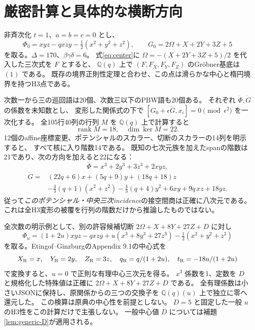 \documentclass[11pt,a4paper]{ltjsarticle}
\theoremstyle{definition}\newtheorem{definition}[theorem]{定義}
\theoremstyle{remark}\newtheorem{remark}[theorem]{注意}
\begin{document}
\section{厳密計算と具体的な横断方向}\label{sec:exact}
非斉次化 $t=1$、$a=b=c=0$ とし、
\[
\Phi_0=xyz-qxzy-\tfrac12(x^2+y^2+z^2),\qquad
G_0=2\Omega+X+2Y+3Z+5
\]
を取る。$\Delta=170$、$\beta\gamma\delta=6$。
式\eqref{eq:center}に $\Omega=-(X+2Y+3Z+5)/2$ を代入した三次式を $F$ とすると、
$\mathbb Q(q)$ 上で $(F,F_X,F_Y,F_Z)$ のGr\"obner基底は $(1)$ である。
既存の境界正則性定理と合わせ、この点は滑らかな中心と楕円境界を持つH3点である。

次数一から三の巡回語は20個、次数三以下のPBW語も20個ある。
それぞれ $\dot\Phi,\dot G$ の係数を未知数とし、
変形した関係式の下で $[G_0+\epsilon\dot G,x_i]=0\pmod{\epsilon^2}$ を一次化する。
全105行40列の行列 $M$ を $\mathbb Q(q)$ 上で計算すると
\[
\operatorname{rank}M=18,\quad\dim\ker M=22.
\]
12個のaffine座標変更、ポテンシャルのスカラー、切断のスカラーの14列を明示すると、
すべて核に入り階数14である。
既知の七次元族を加えたspanの階数は21であり、次の方向を加えると22になる：
\[
\dot\Phi=x^3+2y^3+3z^3+2xyz,
\]
\begin{align*}
\dot G={}&(22q+6)x+(5q+9)y+(18q+18)z\\
&-\tfrac43(q+1)(x^2+z^2)-\tfrac43(q+4)y^2+6xy+9q\,xz+18yz.
\end{align*}
従って\emph{このポテンシャル・中央三次incidence}の接空間商は正確に八次元である。
これは全H3変形の被覆を行列の階数だけから推論したものではない。

全次数の明示例として、別の許容候補切断
$2\Omega+X+8Y+27Z+D$ に対し
\begin{equation}\label{eq:explicit-integral}
\Phi_u=(1+2u)xyz-qxzy+u(x^3+8y^3+27z^3)-\tfrac12(x^2+y^2+z^2)
\end{equation}
を取る。Etingof--GinzburgのAppendix 9.1の中心式を
\[
X_{\rm R}=x,\quad Y_{\rm R}=2y,\quad Z_{\rm R}=3z,
\quad q_{\rm R}=q/(1+2u),\quad t_{\rm R}=-18u/(1+2u)
\]
で変換すると、$u=0$ で正則な有理中心三次元を得る。
$x^3$ 係数を1、定数を $D$ と規格化した特殊値は正確に
$2\Omega+X+8Y+27Z+D$ である。
全有理係数は小さいJSONに保持し、原関係からの三つの交換子を
$\mathbb Q(q)(u)$ 上で独立に零へ還元した。
この検算は原典の中心性を前提としない。
$D=5$ と固定した一般 $u$ のH3性をこの計算だけで主張しない。
一般中心値 $D$ については補題\ref{lem:generic-D}が適用される。
\end{document}
